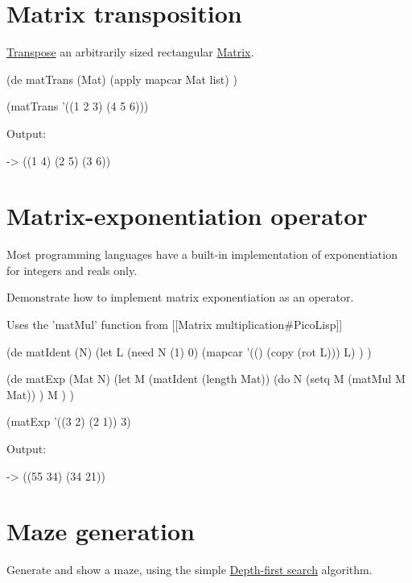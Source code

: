 \pagebreak{}
\section*{Matrix transposition}

\href{http://en.wikipedia.org/wiki/Transpose}{Transpose} an arbitrarily
sized rectangular
\href{http://en.wikipedia.org/wiki/Matrix\_(mathematics)}{Matrix}.


\begin{wideverbatim}

(de matTrans (Mat)
   (apply mapcar Mat list) )

(matTrans '((1 2 3) (4 5 6)))

Output:

-> ((1 4) (2 5) (3 6))

\end{wideverbatim}

\pagebreak{}
\section*{Matrix-exponentiation operator}

Most programming languages have a built-in implementation of
exponentiation for integers and reals only.

Demonstrate how to implement matrix exponentiation as an operator.


\begin{wideverbatim}

Uses the 'matMul' function from [[Matrix multiplication#PicoLisp]]

(de matIdent (N)
   (let L (need N (1) 0)
      (mapcar '(() (copy (rot L))) L) ) )

(de matExp (Mat N)
   (let M (matIdent (length Mat))
      (do N
         (setq M (matMul M Mat)) )
      M ) )

(matExp '((3 2) (2 1)) 3)

Output:

-> ((55 34) (34 21))

\end{wideverbatim}

\pagebreak{}
\section*{Maze generation}

Generate and show a maze, using the simple
\href{http://en.wikipedia.org/wiki/Maze\_generation\_algorithm\#Depth-first\_search}{Depth-first
  search} algorithm.

